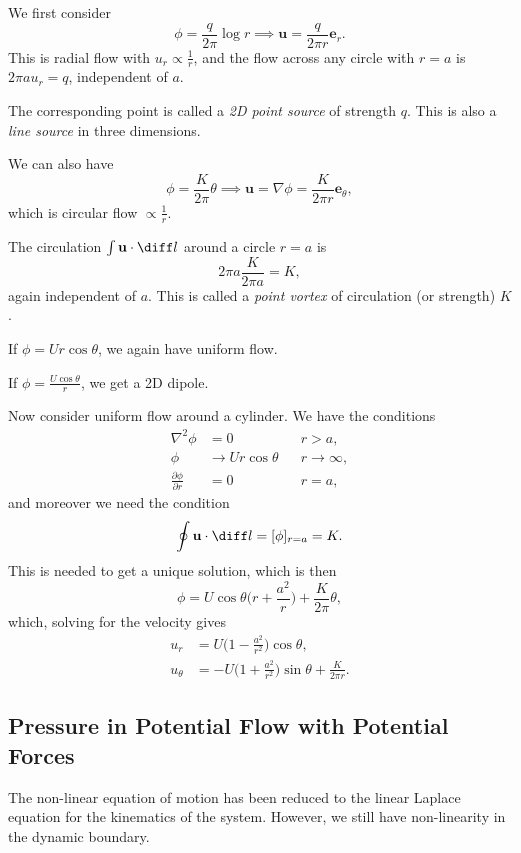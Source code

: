 \documentclass[12pt]{article}
\begin{document}

We first consider
\[
\phi = \frac{q}{2 \pi} \log r \implies \mathbf{u} = \frac{q}{2 \pi r}\mathbf{e}_r.
\]
This is radial flow with $u_r \propto \frac{1}{r}$, and the flow across any circle with $r = a$ is $2 \pi a u_r = q$, independent of $a$.

The corresponding point is called a \emph{2D point source} of strength $q$. This is also a \emph{line source} in three dimensions.

We can also have
\[
\phi = \frac{K}{2 \pi}\theta \implies \mathbf{u} = \nabla \phi = \frac{K}{2 \pi r} \mathbf{e}_{\theta},
\]
which is circular flow $\propto \frac{1}{r}$.

The circulation $\int \mathbf{u} \cdot \diff l$ around a circle $r = a$ is
\[
2 \pi a \frac{K}{2 \pi a} = K,
\]
again independent of $a$. This is called a \emph{point vortex} of circulation (or strength) $K$.

If $\phi = U r \cos \theta$, we again have uniform flow.

If $\phi = \frac{U \cos \theta}{r}$, we get a 2D dipole.

Now consider uniform flow around a cylinder. We have the conditions
\begin{align*}
	\nabla^2 \phi &= 0 & &r>a,\\
	\phi &\to U r \cos \theta & &r \to \infty,\\
	\frac{\partial \phi}{\partial r} &= 0 & &r=a,
\end{align*}
and moreover we need the condition
\[
	\oint \mathbf{u} \cdot \diff l = [\phi]_{r = a} = K.
\]
This is needed to get a unique solution, which is then
\[
\phi = U \cos \theta \biggl( r + \frac{a^2}{r} \biggr) + \frac{K}{2\pi}\theta,
\]
which, solving for the velocity gives
\begin{align*}
	u_r &= U \biggl( 1 - \frac{a^2}{r^2} \biggr) \cos \theta, \\
	u_{\theta} &= - U \biggl( 1 + \frac{a^2}{r^2} \biggr) \sin \theta + \frac{K}{2 \pi r}.
\end{align*}

\subsection{Pressure in Potential Flow with Potential Forces}
\label{sub:pressure_in_potential_flow_with_potential_forces}

The non-linear equation of motion has been reduced to the linear Laplace equation for the kinematics of the system. However, we still have non-linearity in the dynamic boundary.
\end{document}
